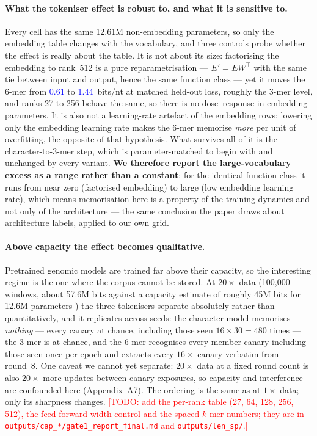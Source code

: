\documentclass[10pt,letterpaper]{article}
\newcommand{\TODO}[1]{\textcolor{red}{[TODO: #1]}}
\newcommand{\NUM}[1]{\textcolor{blue}{#1}}
\newcommand{\bits}{bits/nt}
\newcommand{\kmer}[1]{#1-mer}
\begin{document}
\paragraph{What the tokeniser effect is robust to, and what it is sensitive to.}
Every cell has the same 12.61M non-embedding parameters, so only the embedding table changes with the
vocabulary, and three controls probe whether the effect is really about the table. It is not about
its size: factorising the embedding to rank~512 is a pure reparametrisation --- $E' = EW^{\!\top}$
with the same tie between input and output, hence the same function class --- yet it moves the
\kmer{6} from \NUM{0.61} to \NUM{1.44}~\bits{} at matched held-out loss, roughly the \kmer{3} level,
and ranks 27 to 256 behave the same, so there is no dose--response in embedding parameters. It is
also not a learning-rate artefact of the embedding rows: lowering only the embedding learning rate
makes the \kmer{6} memorise \emph{more} per unit of overfitting, the opposite of that hypothesis.
What survives all of it is the character-to-\kmer{3} step, which is parameter-matched to begin with
and unchanged by every variant. \textbf{We therefore report the large-vocabulary excess as a range
rather than a constant}: for the identical function class it runs from near zero (factorised
embedding) to large (low embedding learning rate), which means memorisation here is a property of
the training dynamics and not only of the architecture --- the same conclusion the paper draws about
architecture labels, applied to our own grid.

\paragraph{Above capacity the effect becomes qualitative.}
Pretrained genomic models are trained far above their capacity, so the interesting regime is the one
where the corpus cannot be stored. At $20\times$ data (100{,}000 windows, about 57.6M bits against a
capacity estimate of roughly 45M bits for 12.6M parameters \cite{morris2025capacity}) the three
tokenisers separate absolutely rather than quantitatively, and it replicates across seeds: the
character model memorises \emph{nothing} --- every canary at chance, including those seen
$16 \times 30 = 480$ times --- the \kmer{3} is at chance, and the \kmer{6} recognises every member
canary including those seen once per epoch and extracts every $16\times$ canary verbatim from
round~8. One caveat we cannot yet separate: $20\times$ data at a fixed round count is also
$20\times$ more updates between canary exposures, so capacity and interference are confounded here
(Appendix~A7). The ordering is the same as at $1\times$ data; only its sharpness changes.
\TODO{add the per-rank table (27, 64, 128, 256, 512), the feed-forward width control and the spaced
$k$-mer numbers; they are in \texttt{outputs/cap\_*/gate1\_report\_final.md} and
\texttt{outputs/len\_sp/}.}
\end{document}
